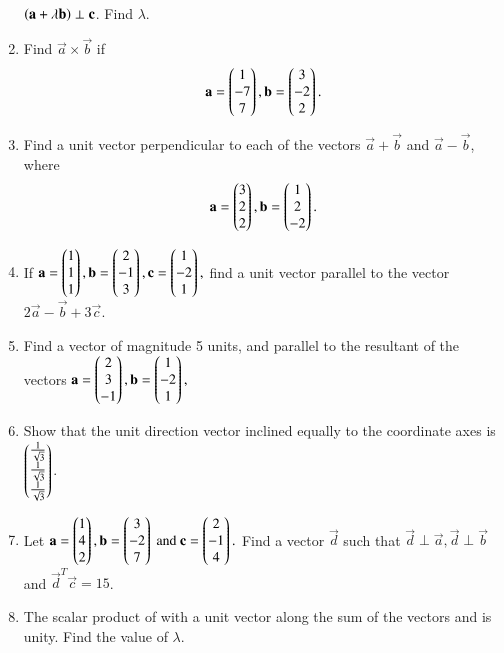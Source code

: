 \begin{enumerate}[label=\arabic*.,ref=\thesubsection.\theenumi]
\begin{align}
\end{align}
$\left(\mathbf{a}+\lambda\mathbf{b}\right)\perp\mathbf{c}$.  Find $\lambda$.
\item Find ${\vec{a} \times \vec{b}}$ if 
\begin{align}
\mathbf{a}=\begin{pmatrix}1\\-7\\7\end{pmatrix},
\mathbf{b}=\begin{pmatrix}3\\-2\\2\end{pmatrix}.
\end{align}
\item Find a unit vector perpendicular to each of the vectors 
$\vec{a}+\vec{b}$ and $\vec{a}-\vec{b}$, where 
\begin{align}
\mathbf{a}=\begin{pmatrix}3\\2\\2\end{pmatrix},
\mathbf{b}=\begin{pmatrix}1\\2\\-2\end{pmatrix}.
\end{align}
\item  If 
$
\mathbf{a}=\begin{pmatrix}1\\1\\1\end{pmatrix},
\mathbf{b}=\begin{pmatrix}2\\-1\\3\end{pmatrix},
\mathbf{c}=\begin{pmatrix}1\\-2\\1\end{pmatrix},
$
find a unit vector parallel to the vector $2\vec{a}-\vec{b}+3\vec{c}$.
\item Find a vector of magnitude 5 units, and parallel to the resultant of the vectors 
$
\mathbf{a}=\begin{pmatrix}2\\3\\-1\end{pmatrix},
\mathbf{b}=\begin{pmatrix}1\\-2\\1\end{pmatrix},
$
\item Show that the unit direction vector inclined equally to the coordinate axes is $\begin{pmatrix}\frac{1}{\sqrt{3}}\\\frac{1}{\sqrt{3}}\\ \frac{1}{\sqrt{3}}\end{pmatrix}$.
\item Let 
$
\mathbf{a}=\begin{pmatrix}1\\4\\2\end{pmatrix},
\mathbf{b}=\begin{pmatrix}3\\-2\\7\end{pmatrix} \text{ and }
\mathbf{c}=\begin{pmatrix}2\\-1\\4\end{pmatrix}.
$
Find a vector $\vec{d}$ such that $\vec{d}\perp\vec{a},\vec{d}\perp\vec{b}$ and $\vec{d}^T\vec{c} = 15$.
\item The scalar product of  with a unit vector along the sum  of the vectors  and  is unity.  Find the value of $\lambda$.

\end{enumerate}
